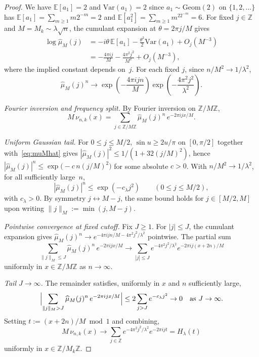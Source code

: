 \documentclass[11pt,a4paper]{amsart}
\theoremstyle{plain}
\theoremstyle{definition}
\newcommand{\Z}{\mathbb{Z}}
\newcommand{\E}{\mathbb{E}}
\newcommand{\Geom}{\mathrm{Geom}}
\newcommand{\Var}{\mathrm{Var}}
\begin{document}
\begin{proof}
We have $\E[a_1]=2$ and $\Var(a_1)=2$ since $a_1\sim\Geom(2)$ on
$\{1,2,\dots\}$ has $\E[a_1]=\sum_{m\ge1}m2^{-m}=2$ and
$\E[a_1^2]=\sum_{m\ge1}m^22^{-m}=6$.
For fixed $j\in\Z$ and $M=M_k\sim\lambda\sqrt n$, the cumulant expansion at
$\theta=2\pi j/M$ gives
\begin{align*}
\log\widehat\mu_M(j)
&=-i\theta\,\E[a_1]-\frac{\theta^2}{2}\Var(a_1)+O_j(M^{-3})\\
&=-\frac{4\pi ij}{M}-\frac{4\pi^2 j^2}{M^2}+O_j(M^{-3}),
\end{align*}
where the implied constant depends on~$j$.
For each fixed $j$, since $n/M^2\to 1/\lambda^2$,
$$
\widehat\mu_M(j)^n\to
\exp\!\left(-\frac{4\pi ijn}{M}\right)\exp\!\left(-\frac{4\pi^2 j^2}{\lambda^2}\right).
$$

\emph{Fourier inversion and frequency split.}
By Fourier inversion on $\Z/M\Z$,
\begin{equation}\label{eq:fourinv}
M\,\nu_{n,k}(x)=\sum_{j\in\Z/M\Z}\widehat\mu_M(j)^n\,e^{-2\pi ijx/M}.
\end{equation}

\emph{Uniform Gaussian tail.}
For $0\le j\le M/2$, $\sin u\ge 2u/\pi$ on $[0,\pi/2]$ together with~\eqref{eq:muMhat}
gives $|\widehat\mu_M(j)|^2\le 1/(1+32(j/M)^2)$, hence
$|\widehat\mu_M(j)|^n\le\exp\bigl(-c\,n(j/M)^2\bigr)$
for some absolute $c>0$.
With $n/M^2\to 1/\lambda^2$, for all sufficiently large~$n$,
$$
|\widehat\mu_M(j)|^n\le\exp(-c_\lambda j^2)\qquad(0\le j\le M/2),
$$
with $c_\lambda>0$.
By symmetry $j\leftrightarrow M-j$, the same bound holds for $j\in[M/2,M]$
upon writing $\|j\|_M:=\min(j,M-j)$.

\emph{Pointwise convergence at fixed cutoff.}
Fix $J\ge 1$.
For $|j|\le J$, the cumulant expansion gives $\widehat\mu_M(j)^n\to e^{-4\pi ijn/M-4\pi^2 j^2/\lambda^2}$
pointwise.
The partial sum
$$
\sum_{\|j\|_M\le J}\widehat\mu_M(j)^n\,e^{-2\pi ijx/M}
\to
\sum_{|j|\le J}e^{-4\pi^2 j^2/\lambda^2}e^{-2\pi ij(x+2n)/M}
$$
uniformly in $x\in\Z/M\Z$ as $n\to\infty$.

\emph{Tail $J\to\infty$.}
The remainder satisfies, uniformly in $x$ and $n$ sufficiently large,
$$
\Bigl|\sum_{\|j\|_M>J}\widehat\mu_M(j)^n\,e^{-2\pi ijx/M}\Bigr|
\le 2\sum_{j>J}e^{-c_\lambda j^2}\to 0\quad\text{as }J\to\infty.
$$
Setting $t:=(x+2n)/M\bmod 1$ and combining,
\begin{equation}\label{eq:fourinv-limit}
M\,\nu_{n,k}(x)\to\sum_{j\in\Z}e^{-4\pi^2j^2/\lambda^2}e^{-2\pi ijt}=H_\lambda(t)
\end{equation}
uniformly in $x\in\Z/M_k\Z$.


\end{proof}
\end{document}
